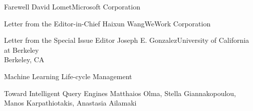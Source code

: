 \documentclass[11pt]{article}
\begin{document}


\begin{bulletin}

%
%

\begin{lettersection}


\begin{letter}{Farewell}
{David Lomet}{Microsoft Corporation}

\end{letter}
\newpage
\begin{letter}{Letter from the Editor-in-Chief}
{Haixun Wang}{WeWork Corporation}

\end{letter}
%
\newpage
%
%

\begin{letter}{Letter from the Special Issue Editor}
{Joseph E. Gonzalez}{University of California at Berkeley\\ Berkeley, CA}
\graphicspath{{letters/}}

\end{letter}

\end{lettersection}



\begin{articlesection}{Machine Learning Life-cycle Management}
%
%
%
\begin{article}
{Toward Intelligent Query Engines}
{Matthaios Olma,  Stella Giannakopoulou,  Manos Karpathiotakis, Anastasia Ailamaki}
\graphicspath{{submissions/adaptivedb/}}

\end{article}



\end{articlesection}
\end{bulletin}
\end{document}
